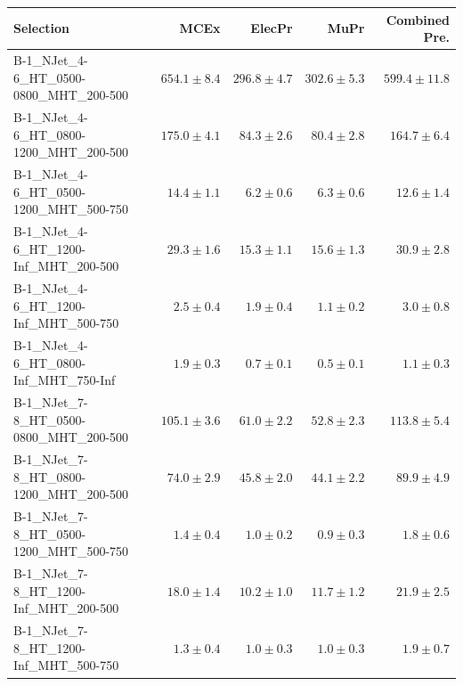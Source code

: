 \documentclass{beamer}
\begin{document}
\begin{frame}
\tiny
\begin{tabular}{lrrrr}
\toprule

                                                Selection  &                     MCEx  &           ElecPr  &             MuPr  &          Combined Pre.  \\ 
\midrule
     B-1\_NJet\_4-6\_HT\_0500-0800\_MHT\_200-500 &             $654.1\pm8.4$&             $296.8\pm4.7$&             $302.6\pm5.3$&                $599.4\pm11.8$ \\ 
      B-1\_NJet\_4-6\_HT\_0800-1200\_MHT\_200-500 &             $175.0\pm4.1$&              $84.3\pm2.6$&              $80.4\pm2.8$&                 $164.7\pm6.4$ \\ 
      B-1\_NJet\_4-6\_HT\_0500-1200\_MHT\_500-750 &              $14.4\pm1.1$&               $6.2\pm0.6$&               $6.3\pm0.6$&                  $12.6\pm1.4$ \\ 
       B-1\_NJet\_4-6\_HT\_1200-Inf\_MHT\_200-500 &              $29.3\pm1.6$&              $15.3\pm1.1$&              $15.6\pm1.3$&                  $30.9\pm2.8$ \\ 
       B-1\_NJet\_4-6\_HT\_1200-Inf\_MHT\_500-750 &               $2.5\pm0.4$&               $1.9\pm0.4$&               $1.1\pm0.2$&                   $3.0\pm0.8$ \\ 
       B-1\_NJet\_4-6\_HT\_0800-Inf\_MHT\_750-Inf &               $1.9\pm0.3$&               $0.7\pm0.1$&               $0.5\pm0.1$&                   $1.1\pm0.3$ \\ 
      B-1\_NJet\_7-8\_HT\_0500-0800\_MHT\_200-500 &             $105.1\pm3.6$&              $61.0\pm2.2$&              $52.8\pm2.3$&                 $113.8\pm5.4$ \\ 
      B-1\_NJet\_7-8\_HT\_0800-1200\_MHT\_200-500 &              $74.0\pm2.9$&              $45.8\pm2.0$&              $44.1\pm2.2$&                  $89.9\pm4.9$ \\ 
      B-1\_NJet\_7-8\_HT\_0500-1200\_MHT\_500-750 &               $1.4\pm0.4$&               $1.0\pm0.2$&               $0.9\pm0.3$&                   $1.8\pm0.6$ \\ 
       B-1\_NJet\_7-8\_HT\_1200-Inf\_MHT\_200-500 &              $18.0\pm1.4$&              $10.2\pm1.0$&              $11.7\pm1.2$&                  $21.9\pm2.5$ \\ 
       B-1\_NJet\_7-8\_HT\_1200-Inf\_MHT\_500-750 &               $1.3\pm0.4$&               $1.0\pm0.3$&               $1.0\pm0.3$&                   $1.9\pm0.7$ \\ 

\end{tabular}
\end{frame}
\end{document}
